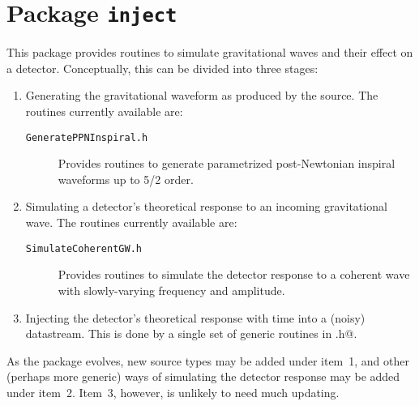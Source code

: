 \chapter{Package \texttt{inject}}

This package provides routines to simulate gravitational waves and
their effect on a detector.  Conceptually, this can be divided into
three stages:
\begin{enumerate}
\item Generating the gravitational waveform as produced by the source.
The routines currently available are:
\begin{description}
\item[\texttt{GeneratePPNInspiral.h}] Provides routines to generate
parametrized post-Newtonian inspiral waveforms up to 5/2 order.
\end{description}

\item Simulating a detector's theoretical response to an incoming
gravitational wave.  The routines currently available are:
\begin{description}
\item[\texttt{SimulateCoherentGW.h}] Provides routines to simulate the
detector response to a coherent wave with slowly-varying frequency and
amplitude.
\end{description}

\item Injecting the detector's theoretical response with time into a
(noisy) datastream.  This is done by a single set of generic routines
in \verb@Inject.h@.
\end{enumerate}

As the package evolves, new source types may be added under item~1,
and other (perhaps more generic) ways of simulating the detector
response may be added under item~2.  Item~3, however, is unlikely to
need much updating.

\newpage
\newpage
\newpage
\newpage
\newpage
\newpage

